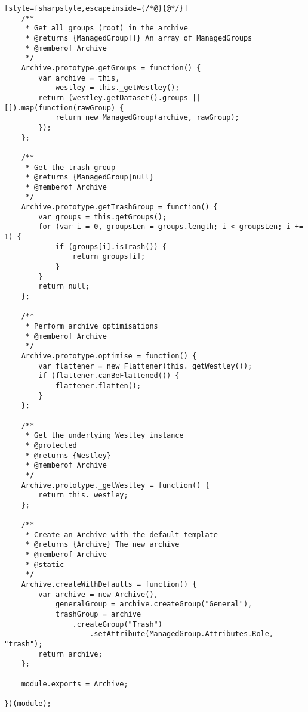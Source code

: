 \begin{lstlisting}[style=fsharpstyle,escapeinside={/*@}{@*/}]
    /**
     * Get all groups (root) in the archive
     * @returns {ManagedGroup[]} An array of ManagedGroups
     * @memberof Archive
     */
    Archive.prototype.getGroups = function() {
        var archive = this,
            westley = this._getWestley();
        return (westley.getDataset().groups || []).map(function(rawGroup) {
            return new ManagedGroup(archive, rawGroup);
        });
    };

    /**
     * Get the trash group
     * @returns {ManagedGroup|null}
     * @memberof Archive
     */
    Archive.prototype.getTrashGroup = function() {
        var groups = this.getGroups();
        for (var i = 0, groupsLen = groups.length; i < groupsLen; i += 1) {
            if (groups[i].isTrash()) {
                return groups[i];
            }
        }
        return null;
    };

    /**
     * Perform archive optimisations
     * @memberof Archive
     */
    Archive.prototype.optimise = function() {
        var flattener = new Flattener(this._getWestley());
        if (flattener.canBeFlattened()) {
            flattener.flatten();
        }
    };

    /**
     * Get the underlying Westley instance
     * @protected
     * @returns {Westley}
     * @memberof Archive
     */
    Archive.prototype._getWestley = function() {
        return this._westley;
    };

    /**
     * Create an Archive with the default template
     * @returns {Archive} The new archive
     * @memberof Archive
     * @static
     */
    Archive.createWithDefaults = function() {
        var archive = new Archive(),
            generalGroup = archive.createGroup("General"),
            trashGroup = archive
                .createGroup("Trash")
                    .setAttribute(ManagedGroup.Attributes.Role, "trash");
        return archive;
    };

    module.exports = Archive;

})(module);

\end{lstlisting}